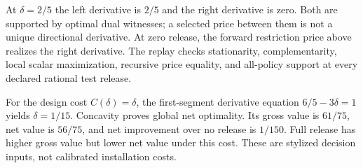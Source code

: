 At $\delta=2/5$ the left derivative is $2/5$ and the right derivative is zero. Both are supported by optimal dual witnesses; a selected price between them is not a unique directional derivative. At zero release, the forward restriction price above realizes the right derivative. The replay checks stationarity, complementarity, local scalar maximization, recursive price equality, and all-policy support at every declared rational test release.

For the design cost $C(\delta)=\delta$, the first-segment derivative equation $6/5-3\delta=1$ yields $\delta=1/15$. Concavity proves global net optimality. Its gross value is $61/75$, net value is $56/75$, and net improvement over no release is $1/150$. Full release has higher gross value but lower net value under this cost. These are stylized decision inputs, not calibrated installation costs.

